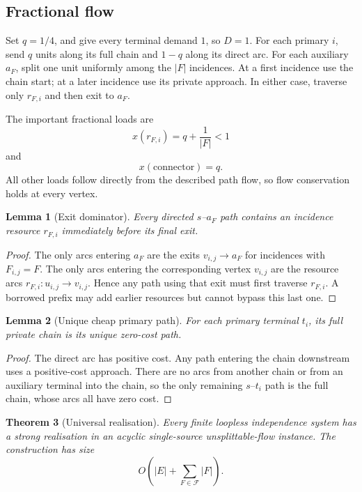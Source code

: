 \documentclass[11pt]{article}
\newtheorem{theorem}{Theorem}
\newtheorem{lemma}[theorem]{Lemma}
\theoremstyle{definition}
\newcommand{\calF}{\mathcal{F}}
\begin{document}
\subsection{Fractional flow}

Set \(q=1/4\), and give every terminal demand \(1\), so \(D=1\). For each primary \(i\), send \(q\) units along its full chain and \(1-q\) along its direct arc. For each auxiliary \(a_F\), split one unit uniformly among the \(|F|\) incidences. At a first incidence use the chain start; at a later incidence use its private approach. In either case, traverse only \(r_{F,i}\) and then exit to \(a_F\).

The important fractional loads are
\[
x(r_{F,i})=q+\frac1{|F|}<1
\]
and
\[
x(\text{connector})=q.
\]
All other loads follow directly from the described path flow, so flow conservation holds at every vertex.

\begin{lemma}[Exit dominator]\label{lem:dominator}
Every directed \(s\)--\(a_F\) path contains an incidence resource \(r_{F,i}\) immediately before its final exit.
\end{lemma}

\begin{proof}
The only arcs entering \(a_F\) are the exits \(v_{i,j}\to a_F\) for incidences with \(F_{i,j}=F\). The only arcs entering the corresponding vertex \(v_{i,j}\) are the resource arcs \(r_{F,i}:u_{i,j}\to v_{i,j}\). Hence any path using that exit must first traverse \(r_{F,i}\). A borrowed prefix may add earlier resources but cannot bypass this last one.
\end{proof}

\begin{lemma}[Unique cheap primary path]\label{lem:unique}
For each primary terminal \(t_i\), its full private chain is its unique zero-cost path.
\end{lemma}

\begin{proof}
The direct arc has positive cost. Any path entering the chain downstream uses a positive-cost approach. There are no arcs from another chain or from an auxiliary terminal into the chain, so the only remaining \(s\)--\(t_i\) path is the full chain, whose arcs all have zero cost.
\end{proof}

\begin{theorem}[Universal realisation]\label{thm:universal}
Every finite loopless independence system has a strong realisation in an acyclic single-source unsplittable-flow instance. The construction has size
\[
O\!\left(|E|+\sum_{F\in\calF}|F|\right).
\]
\end{theorem}
\end{document}

